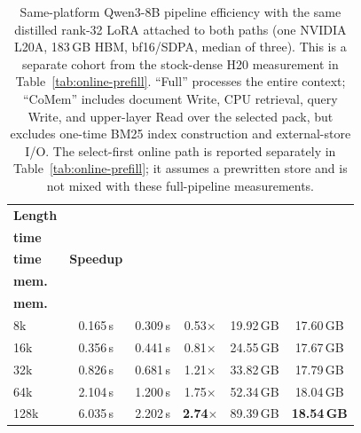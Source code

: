 \begin{table}[!t]
\centering
\small
\setlength{\tabcolsep}{3.3pt}
\begin{tabular}{@{}lccccc@{}}
\toprule
\textbf{Length} & \shortstack{\textbf{Full}\\\textbf{time}} & \shortstack{\textbf{CoMem}\\\textbf{time}} & \textbf{Speedup} & \shortstack{\textbf{Full}\\\textbf{mem.}} & \shortstack{\textbf{CoMem}\\\textbf{mem.}} \\
\midrule
8k   & 0.165\,s & 0.309\,s & 0.53$\times$ & 19.92\,GB & 17.60\,GB \\
16k  & 0.356\,s & 0.441\,s & 0.81$\times$ & 24.55\,GB & 17.67\,GB \\
32k  & 0.826\,s & 0.681\,s & 1.21$\times$ & 33.82\,GB & 17.79\,GB \\
64k  & 2.104\,s & 1.200\,s & 1.75$\times$ & 52.34\,GB & 18.04\,GB \\
128k & 6.035\,s & 2.202\,s & \textbf{2.74$\times$} & 89.39\,GB & \textbf{18.54\,GB} \\
\bottomrule
\end{tabular}
\caption{Same-platform Qwen3-8B pipeline efficiency with the same distilled rank-32 LoRA
attached to both paths (one NVIDIA L20A, 183\,GB HBM, bf16/SDPA, median of three). This
is a separate cohort from the stock-dense H20 measurement in
Table~\ref{tab:online-prefill}. ``Full''
processes the entire context; ``CoMem'' includes document Write, CPU retrieval,
query Write, and upper-layer Read over the selected pack, but excludes one-time
BM25 index construction and external-store I/O. The select-first online path is
reported separately in Table~\ref{tab:online-prefill}; it assumes a prewritten
store and is not mixed with these full-pipeline measurements.}
\label{tab:eff}
\end{table}
